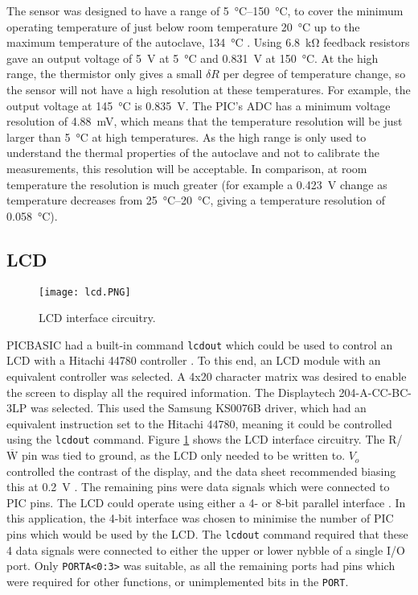 The sensor was designed to have a range of \SIrange{5}{150}{\celsius}, to cover the minimum operating temperature of just below room temperature \SI{20}{\celsius} up to the maximum temperature of the autoclave, \SI{134}{\celsius} \cite{nhs_autoclave}. Using \SI{6.8}{\kilo\ohm} feedback resistors gave an output voltage of \SI{5}{\volt} at \SI{5}{\celsius} and \SI{0.831}{\volt} at \SI{150}{\celsius}. At the high range, the thermistor only gives a small $\delta R$ per degree of temperature change, so the sensor will not have a high resolution at these temperatures. For example, the output voltage at \SI{145}{\celsius} is \SI{0.835}{\volt}. The PIC's ADC has a minimum voltage resolution of \SI{4.88}{\milli\volt}, which means that the temperature resolution will be just larger than \SI{5}{\celsius} at high temperatures. As the high range is only used to understand the thermal properties of the autoclave and not to calibrate the measurements, this resolution will be acceptable. In comparison, at room temperature the resolution is much greater (for example a \SI{0.423}{\volt} change as temperature decreases from \SIrange{25}{20}{\celsius}, giving a temperature resolution of \SI{0.058}{\celsius}).





\subsection{LCD}
\begin{figure}[htb]
	\centering
	\texttt{[image: lcd.PNG]}
	\caption{LCD interface circuitry.}
	\label{fig: lcd schematic}
\end{figure}

PICBASIC had a built-in command \verb|lcdout| which could be used to control an LCD with a Hitachi 44780 controller \cite{picbasic_pro}. To this end, an LCD module with an equivalent controller was selected. A 4x20 character matrix was desired to enable the screen to display all the required information. The Displaytech 204-A-CC-BC-3LP \cite{lcd} was selected. This used the Samsung KS0076B driver, which had an equivalent instruction set to the Hitachi 44780, meaning it could be controlled using the \verb|lcdout| command. Figure \ref{fig: lcd schematic} shows the LCD interface circuitry. The R/$\overline{\text{W}}$ pin was tied to ground, as the LCD only needed to be written to. $V_o$ controlled the contrast of the display, and the data sheet recommended biasing this at \SI{0.2}{\volt} \cite{lcd}. The remaining pins were data signals which were connected to PIC pins. The LCD could operate using either a 4- or 8-bit parallel interface \cite{picbasic_pro}. In this application, the 4-bit interface was chosen to minimise the number of PIC pins which would be used by the LCD. The \verb|lcdout| command required that these 4 data signals were connected to either the upper or lower nybble of a single I/O port. Only \verb|PORTA<0:3>| was suitable, as all the remaining ports had pins which were required for other functions, or unimplemented bits in the \verb|PORT|.\\

